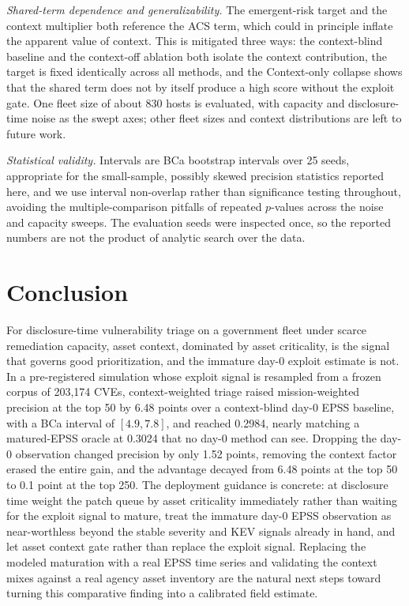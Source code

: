 \documentclass[journal]{IEEEtran}
\begin{document}
\emph{Shared-term dependence and generalizability.} The emergent-risk target and the context
multiplier both reference the ACS term, which could in principle inflate the apparent value of
context. This is mitigated three ways: the context-blind baseline and the context-off ablation both
isolate the context contribution, the target is fixed identically across all methods, and the
Context-only collapse shows that the shared term does not by itself produce a high score without the
exploit gate. One fleet size of about 830 hosts is evaluated, with capacity and disclosure-time
noise as the swept axes; other fleet sizes and context distributions are left to future work.

\emph{Statistical validity.} Intervals are BCa bootstrap intervals over 25 seeds, appropriate for
the small-sample, possibly skewed precision statistics reported here, and we use interval
non-overlap rather than significance testing throughout, avoiding the multiple-comparison pitfalls
of repeated $p$-values across the noise and capacity sweeps. The evaluation seeds were inspected
once, so the reported numbers are not the product of analytic search over the data.

\section{Conclusion}
For disclosure-time vulnerability triage on a government fleet under scarce remediation capacity,
asset context, dominated by asset criticality, is the signal that governs good prioritization, and
the immature day-0 exploit estimate is not. In a pre-registered simulation whose exploit signal is
resampled from a frozen corpus of 203{,}174 CVEs, context-weighted triage raised mission-weighted
precision at the top 50 by 6.48 points over a context-blind day-0 EPSS baseline, with a BCa interval
of $[4.9, 7.8]$, and reached 0.2984, nearly matching a matured-EPSS oracle at 0.3024 that no day-0
method can see. Dropping the day-0 observation changed precision by only 1.52 points, removing the
context factor erased the entire gain, and the advantage decayed from 6.48 points at the top 50 to
0.1 point at the top 250. The deployment guidance is concrete: at disclosure time weight the patch
queue by asset criticality immediately rather than waiting for the exploit signal to mature, treat
the immature day-0 EPSS observation as near-worthless beyond the stable severity and KEV signals
already in hand, and let asset context gate rather than replace the exploit signal. Replacing the
modeled maturation with a real EPSS time series and validating the context mixes against a real
agency asset inventory are the natural next steps toward turning this comparative finding into a
calibrated field estimate.
\end{document}
